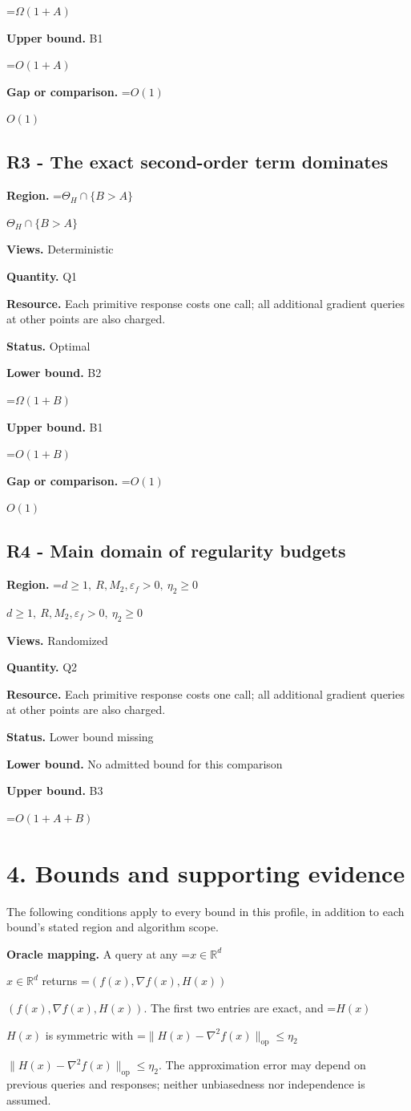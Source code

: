 \documentclass[10pt,a4paper]{article}
\newcommand{\AtlasMath}[1]{\par\begingroup\centering\setbox0=\hbox{$\displaystyle #1$}\ifdim\wd0>1.4\linewidth\typeout{ATLAS WIDE FORMULA: \the\wd0}\fi\ifdim\wd0>\linewidth\resizebox{\linewidth}{!}{\box0}\else\box0\fi\par\endgroup}
\newcommand{\AtlasInlineMath}[1]{\begingroup\setbox0=\hbox{$#1$}\ifdim\wd0>.4\linewidth\endgroup\AtlasMath{#1}\else\endgroup$#1$\fi}
\begin{document}
\AtlasMath{\Omega(1+A)}
\textbf{Upper bound.} B1

\AtlasMath{O(1+A)}
\textbf{Gap or comparison.} \AtlasInlineMath{O(1)}

\subsection{R3 - The exact second-order term dominates}
\textbf{Region.} \AtlasInlineMath{\Theta_H\cap\{B>A\}}

\textbf{Views.} Deterministic

\textbf{Quantity.} Q1

\textbf{Resource.} Each primitive response costs one call; all additional gradient queries at other points are also charged.

\textbf{Status.} Optimal

\textbf{Lower bound.} B2

\AtlasMath{\Omega(1+B)}
\textbf{Upper bound.} B1

\AtlasMath{O(1+B)}
\textbf{Gap or comparison.} \AtlasInlineMath{O(1)}

\subsection{R4 - Main domain of regularity budgets}
\textbf{Region.} \AtlasInlineMath{d\ge1,\ R,M_2,\varepsilon_f>0,\ \eta_2\ge0}

\textbf{Views.} Randomized

\textbf{Quantity.} Q2

\textbf{Resource.} Each primitive response costs one call; all additional gradient queries at other points are also charged.

\textbf{Status.} Lower bound missing

\textbf{Lower bound.} No admitted bound for this comparison

\textbf{Upper bound.} B3

\AtlasMath{O(1+A+B)}
\section{4. Bounds and supporting evidence}
The following conditions apply to every bound in this profile, in addition to each bound's stated region and algorithm scope.

\textbf{Oracle mapping.} A query at any \AtlasInlineMath{x\in\mathbb{R}^d} returns \AtlasInlineMath{(f(x),\nabla f(x),H(x))}. The first two entries are exact, and \AtlasInlineMath{H(x)} is symmetric with \AtlasInlineMath{\|H(x)-\nabla^2f(x)\|_{\mathrm{op}}\le\eta_2}. The approximation error may depend on previous queries and responses; neither unbiasedness nor independence is assumed.
\end{document}
